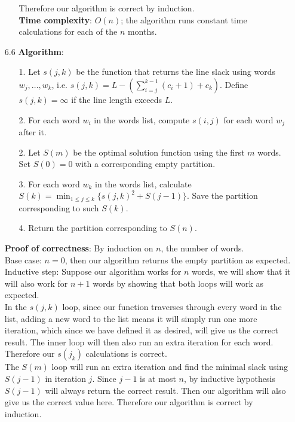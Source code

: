 \documentclass{article}
\begin{document}
\begin{itemize}
\begin{itemize}
                    Therefore our algorithm is correct by induction.\\
                    \textbf{Time complexity}: $O(n)$; the algorithm runs constant time calculations for each of the $n$ months.
          \end{itemize}
    \item [6.6]
          \textbf{Algorithm}:
          \begin{itemize}
              \item [1.] Let $s(j,k)$ be the function that returns the line slack using words $w_j,\ldots,w_k$, i.e. $s(j,k)=L-(\sum_{i=j}^{k-1}(c_i+1)+c_k)$. Define $s(j,k)=\infty$ if the line length exceeds $L$.
              \item [2.] For each word $w_i$ in the words list, compute $s(i,j)$ for each word $w_j$ after it.
              \item [2.] Let $S(m)$ be the optimal solution function using the first $m$ words. Set $S(0)=0$ with a corresponding empty partition.
              \item [3.] For each word $w_k$ in the words list, calculate $S(k)=\min_{1\leq j\leq k}\{s(j,k)^2+S(j-1)\}$. Save the partition corresponding to such $S(k)$.
              \item [4.] Return the partition corresponding to $S(n)$.
          \end{itemize}
          \textbf{Proof of correctness}: By induction on $n$, the number of words.\\
          Base case: $n=0$, then our algorithm returns the empty partition as expected.\\
          Inductive step: Suppose our algorithm works for $n$ words, we will show that it will also work for $n+1$ words by showing that both loops will work as expected.\\
          In the $s(j,k)$ loop, since our function traverses through every word in the list, adding a new word to the list means it will simply run one more iteration, which since we have defined it as desired, will give us the correct result. The inner loop will then also run an extra iteration for each word. Therefore our $s(j_k)$ calculations is correct.\\
          The $S(m)$ loop will run an extra iteration and find the minimal slack using $S(j-1)$ in iteration $j$. Since $j-1$ is at most $n$, by inductive hypothesis $S(j-1)$ will always return the correct result. Then our algorithm will also give us the correct value here.
          Therefore our algorithm is correct by induction.

\end{itemize}
\end{document}
